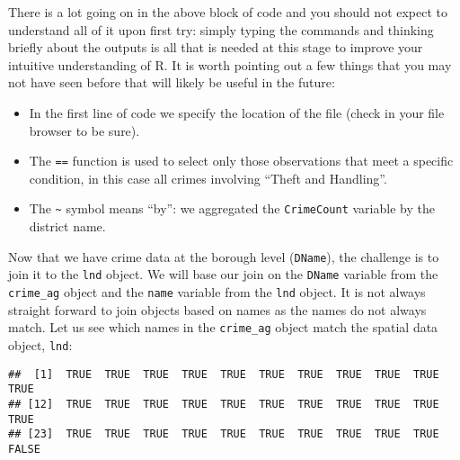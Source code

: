 \documentclass[]{article}
\newenvironment{Shaded}{}{}
\newcommand{\StringTok}[1]{\textcolor[rgb]{0.25,0.44,0.63}{{#1}}}
\newcommand{\CommentTok}[1]{\textcolor[rgb]{0.38,0.63,0.69}{\textit{{#1}}}}
\newcommand{\NormalTok}[1]{{#1}}
\begin{document}
There is a lot going on in the above block of code and you should not
expect to understand all of it upon first try: simply typing the
commands and thinking briefly about the outputs is all that is needed at
this stage to improve your intuitive understanding of R. It is worth
pointing out a few things that you may not have seen before that will
likely be useful in the future:

\begin{itemize}
\itemsep1pt\parskip0pt
\item
  In the first line of code we specify the location of the file (check
  in your file browser to be sure).
\item
  The \texttt{==} function is used to select only those observations
  that meet a specific condition, in this case all crimes involving
  ``Theft and Handling''.
\item
  The \texttt{\textasciitilde{}} symbol means ``by'': we aggregated the
  \texttt{CrimeCount} variable by the district name.
\end{itemize}

Now that we have crime data at the borough level (\texttt{DName}), the
challenge is to join it to the \texttt{lnd} object. We will base our
join on the \texttt{DName} variable from the \texttt{crime\_ag} object
and the \texttt{name} variable from the \texttt{lnd} object. It is not
always straight forward to join objects based on names as the names do
not always match. Let us see which names in the \texttt{crime\_ag}
object match the spatial data object, \texttt{lnd}:

\begin{Shaded}
\end{Shaded}

\begin{verbatim}
##  [1]  TRUE  TRUE  TRUE  TRUE  TRUE  TRUE  TRUE  TRUE  TRUE  TRUE  TRUE
## [12]  TRUE  TRUE  TRUE  TRUE  TRUE  TRUE  TRUE  TRUE  TRUE  TRUE  TRUE
## [23]  TRUE  TRUE  TRUE  TRUE  TRUE  TRUE  TRUE  TRUE  TRUE  TRUE FALSE
\end{verbatim}

\begin{Shaded}
\end{Shaded}
\end{document}
